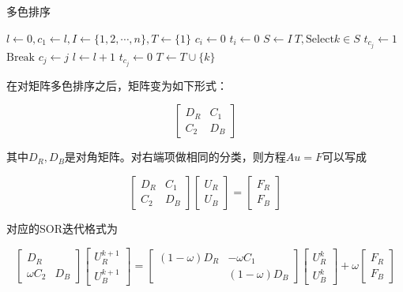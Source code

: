 \documentclass{article}
\begin{document}
\begin{CJK*}{UTF8}{gkai}
	\begin{algorithm}
		\caption{多色排序}
		\begin{algorithmic}[1] %
			\State $l \gets 0,c_{1}\gets l,I \gets \{1,2,\cdots,n\},T\gets \{1\}$
			 $c_{i}\gets 0$
			\EndFor
			 $t_{i}\gets 0$
			\EndFor
				\State $S\gets I\ T,\textrm{Select} k\in S$
				  $t_{c_{j}}\gets 1$
				\EndFor
					 $\textrm{Break}$ 
					\EndIf
				\EndFor
				\State $c_{j}\gets j$
				 $l\gets l+1$
				\EndIf
				 $t_{c_{j}}\gets 0$
				\EndFor
				\State $T \gets T\cup \{k\}$
			\EndWhile
		\end{algorithmic}
	\end{algorithm}
\end{CJK*}

在对矩阵多色排序之后，矩阵变为如下形式：

$$\left[\begin{matrix}
D_{R} & C_{1}\\
C_{2} & D_{B}
\end{matrix}\right]$$

其中$D_{R},D_{B}$是对角矩阵。对右端项做相同的分类，则方程$Au=F$可以写成

$$\left[\begin{matrix}
D_{R} & C_{1}\\
C_{2} & D_{B}
\end{matrix}\right]
\left[\begin{matrix}
U_{R}\\
U_{B}
\end{matrix}\right]=
\left[\begin{matrix}
F_{R}\\
F_{B}
\end{matrix}\right]$$

对应的SOR迭代格式为

$$\left[\begin{matrix}
D_{R} & \\
\omega C_{2} & D_{B}
\end{matrix}\right]
\left[\begin{matrix}
U_{R}^{k+1}\\
U_{B}^{k+1}
\end{matrix}\right]=
\left[\begin{matrix}
(1-\omega)D_{R} & -\omega C_{1}\\
& (1-\omega)D_{B}
\end{matrix}\right]
\left[\begin{matrix}
U_{R}^{k}\\
U_{B}^{k}
\end{matrix}\right]+
\omega
\left[\begin{matrix}
F_{R}\\
F_{B}
\end{matrix}\right]$$
\end{document}
